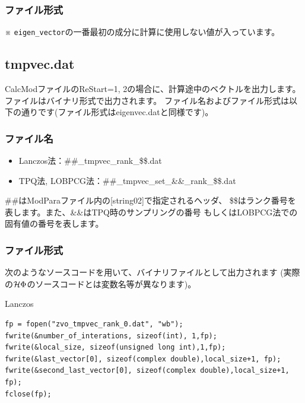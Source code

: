 \subsubsection{ファイル形式}


※ \verb|eigen_vector|の一番最初の成分に計算に使用しない値が入っています。
  
\newpage
\subsection{{tmpvec.dat}}
\label{Subsec:restart}
CalcModファイルのReStart=1, 2の場合に、計算途中のベクトルを出力します。
ファイルはバイナリ形式で出力されます。
ファイル名およびファイル形式は以下の通りです(ファイル形式はeigenvec.datと同様です)。

\subsubsection{ファイル名}
\begin{itemize}
   \item{Lanczos法：\#\#\_tmpvec\_rank\_\$\$.dat}
   \item{TPQ法, LOBPCG法：\#\#\_tmpvec\_set\_\&\&\_rank\_\$\$.dat}   
\end{itemize}
\#\#はModParaファイル内の[string02]で指定されるヘッダ、
\$\$はランク番号を表します。また、\&\&はTPQ時のサンプリングの番号
もしくはLOBPCG法での固有値の番号を表します。

\subsubsection{ファイル形式}

次のようなソースコードを用いて、バイナリファイルとして出力されます
(実際の$\mathcal{H} \Phi$のソースコードとは変数名等が異なります)。

Lanczos
\\
\begin{minipage}{16cm}
\begin{screen}
\begin{verbatim}
fp = fopen("zvo_tmpvec_rank_0.dat", "wb");
fwrite(&number_of_interations, sizeof(int), 1,fp);
fwrite(&local_size, sizeof(unsigned long int),1,fp);
fwrite(&last_vector[0], sizeof(complex double),local_size+1, fp);
fwrite(&second_last_vector[0], sizeof(complex double),local_size+1, fp);
fclose(fp);
\end{verbatim}
\end{screen}
\end{minipage}

